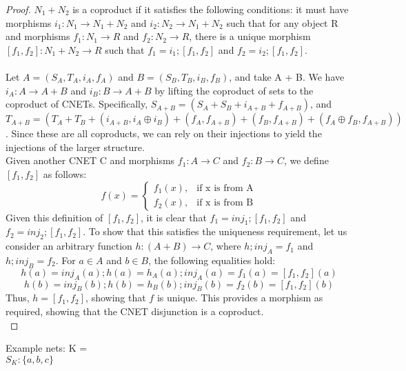 \begin {proof}
$N_1 + N_2$ is a coproduct if it satisfies the following conditions: it must have morphisms $i_1: N_1 \to N_1 + N_2$ and $i_2: N_2 \to N_1 + N_2$ such that for any object R and morphisms $f_1: N_1\to R$ and $f_2: N_2\to R$, there is a unique morphism $[f_1, f_2]: N_1 + N_2 \to R$ such that $f_1 = i_1; [f_1, f_2]$ and $f_2 = i_2; [f_1, f_2]$.\\
\smallskip\\
Let $A = (S_A, T_A, i_A, f_A)$ and $B = (S_B, T_B, i_B, f_B)$, and take A + B. We have $i_A: A \to A + B$  and $i_B: B \to A + B$ by lifting the coproduct of sets to the coproduct of CNETs. Specifically, $S_{A+B} = (S_A + S_B + i_{A+B} + f_{A+B})$, and $T_{A+B} = (T_A + T_B + (i_{A+B}, i_A \oplus i_B) + (f_A, f_{A+B}) + (f_B,f_{A+B})+ (f_A \oplus f_B, f_{A+B}))$. Since these are all coproducts, we can rely on their injections to yield the injections of the larger structure.\smallskip\\ 
Given another CNET C and morphisms $f_1: A\to C$ and $f_2: B\to C$, we define $[f_1, f_2]$ as follows:\\
  \begin{equation}
    f(x)=
    \begin{cases}
      f_1(x), & \text{if x is from A}\\
      f_2(x), & \text{if x is from B}
    \end{cases}
  \end{equation}
Given this definition of $[f_1, f_2]$, it is clear that $f_1 = inj_1;[f_1, f_2]$ and $f_2 = inj_2;[f_1, f_2].$ To show that this satisfies the uniqueness requirement, let us consider an arbitrary function $h : (A+B) \to C$, where $h;inj_A = f_1$ and $h; inj_B = f_2$. For $a\in A$ and $b\in B$, the following equalities hold:\\
\begin{equation}
h(a) = inj_A(a);h(a) = h_A(a); inj_A(a) = f_1(a) = [f_1, f_2](a)
\end {equation}
\begin{equation}
h(b) = inj_B(b);h(b) = h_B(b); inj_B(b) = f_2(b) = [f_1, f_2](b)
\end{equation}
Thus, $h = [f_1, f_2]$, showing that $f$ is unique. 
This provides a morphism as required, showing that the CNET disjunction is a coproduct.  
\bigskip\\
\end{proof}
\newpage
Example nets:
%
K = \\
$S_K :\{ a, b, c\}$\\
